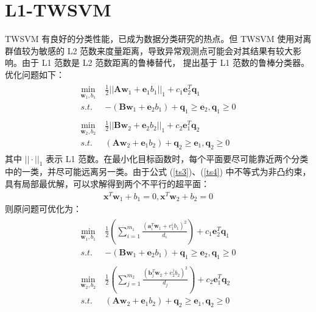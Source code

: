 \section{L1-TWSVM}
TWSVM 有良好的分类性能，已成为数据分类研究的热点。但 TWSVM 使用对离群值较为敏感的 L2 范数来度量距离，导致异常观测点可能会对其结果有较大影响。由于 L1 范数是 L2 范数距离的鲁棒替代，\parencite{yan2018efficient} 提出基于 L1 范数的鲁棒分类器。优化问题如下：
\begin{align}
\begin{split}
\label{ts3}
	\min\limits_{\mathbf{w}_1,b_1} \;& \frac{1}{2}||\mathbf{Aw}_1+\mathbf{e}_1b_1||_1+c_1\mathbf{e}_2^T\mathbf{q}_1 \\
	s.t.\;& -(\mathbf{Bw}_1+\mathbf{e}_2b_1)+\mathbf{q}_1 \geq \mathbf{e}_2,\mathbf{q}_1\geq 0
\end{split}
\\
\begin{split}
\label{ts4}
	\min\limits_{\mathbf{w}_2,b_2} \;& \frac{1}{2}||\mathbf{Bw}_2+\mathbf{e}_2b_2||_1+c_2\mathbf{e}_1^T\mathbf{q}_2 \\
	s.t. \; &(\mathbf{Aw}_2+\mathbf{e}_1b_2)+\mathbf{q}_2\geq \mathbf{e}_1, \mathbf{q}_2\geq 0
\end{split}	
\end{align}
其中 $||\cdot||_1$ 表示 L1 范数。在最小化目标函数时，每个平面要尽可能靠近两个分类中的一类，并尽可能远离另一类。由于公式 (\ref{ts3})、(\ref{ts4}) 中不等式为非凸约束，具有局部最优解，可以求解得到两个不平行的超平面：
\begin{align}
	\mathbf{x}^T\mathbf{w}_1+b_1=0, \mathbf{x}^T\mathbf{w}_2+b_2=0
\end{align}
则原问题可优化为：
\begin{align}
\begin{split}
\label{ts5}
	\min\limits_{\mathbf{w}_1,b_1} \;& \frac{1}{2}(\sum_{i=1}^{m_1}\frac{(\mathbf{a}_i^T\mathbf{w}_1+e_1^ib_1)^2}{d_i})+c_1\mathbf{e}_2^T\mathbf{q}_1  \\
	s.t.\;& -(\mathbf{Bw}_1+\mathbf{e}_2b_1)+\mathbf{q}_1 \geq \mathbf{e}_2,\mathbf{q}_1\geq 0
\end{split}
\\
\begin{split}
	\min\limits_{\mathbf{w}_2,b_2} \;& \frac{1}{2}(\sum_{j=1}^{m_2}\frac{(\mathbf{b}_j^T\mathbf{w}_2+e_2^jb_2)^2}{d_j})+c_2\mathbf{e}_1^T\mathbf{q}_2  \\
	s.t. \; &(\mathbf{Aw}_2+\mathbf{e}_1b_2)+\mathbf{q}_2\geq \mathbf{e}_1, \mathbf{q}_2\geq 0
\end{split}
\end{align}
